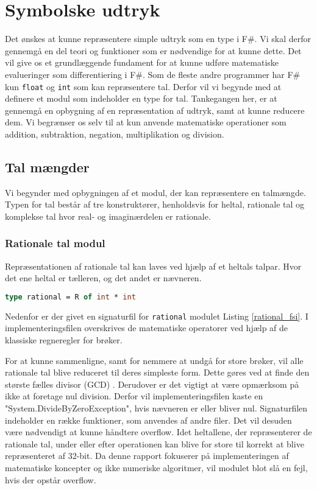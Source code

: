 \section{Symbolske udtryk}
Det ønskes at kunne repræsentere simple udtryk som en type i F\#. Vi skal derfor gennemgå en del teori og funktioner som er nødvendige for at kunne dette. Det vil give os et grundlæggende fundament for at kunne udføre matematiske evalueringer som differentiering i F\#. Som de fleste andre programmer har F\# kun \texttt{float} og \texttt{int} som kan repræsentere tal. Derfor vil vi begynde med at definere et modul som indeholder en type for tal. Tankegangen her, er at gennemgå en opbygning af en repræsentation af udtryk, samt at kunne reducere dem. Vi begrænser os selv til at kun anvende matematiske operationer som addition, subtraktion, negation, multiplikation og division.

\subsection{Tal mængder}
Vi begynder med opbygningen af et modul, der kan repræsentere en talmængde. Typen for tal består af tre konstruktører, henholdsvis for heltal, rationale tal og komplekse tal hvor real- og imaginærdelen er rationale. 

\subsubsection{Rationale tal modul}\label{sec:rational}
Repræsentationen af rationale tal kan laves ved hjælp af et heltals talpar. Hvor det ene heltal er tælleren, og det andet er nævneren.

\begin{lstlisting}[language={FSharp}, 
    label={type_rationel},
    caption={Typen for rationale tal}]
type rational = R of int * int
\end{lstlisting}
Nedenfor er der givet en signaturfil for \texttt{rational} modulet Listing \ref{rational_fsi}. I implementeringsfilen overskrives de matematiske operatorer ved hjælp af de klassiske regneregler for brøker.


For at kunne sammenligne, samt for nemmere at undgå for store brøker, vil alle rationale tal blive reduceret til deres simpleste form. Dette gøres ved at finde den største fælles divisor (GCD) . Derudover er det vigtigt at være opmærksom på ikke at foretage nul division. Derfor vil implementeringsfilen kaste en "System.DivideByZeroException", hvis nævneren er eller bliver nul. Signaturfilen indeholder en række funktioner, som anvendes af andre filer. Det vil desuden være nødvendigt at kunne håndtere overflow. Idet heltallene, der repræsenterer de rationale tal, under eller efter operationen kan blive for store til korrekt at blive repræsenteret af 32-bit. Da denne rapport fokuserer på implementeringen af matematiske koncepter og ikke numeriske algoritmer, vil modulet blot slå en fejl, hvis der opstår overflow.
 


